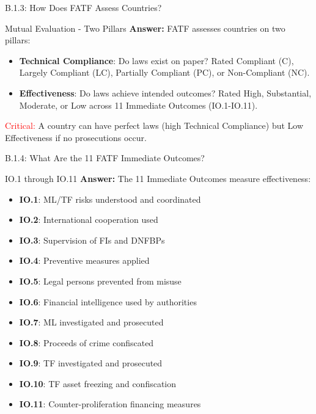 \documentclass{beamer}
\begin{document}
	\begin{frame}{B.1.3: How Does FATF Assess Countries?}
		\begin{block}{Mutual Evaluation - Two Pillars}
			\textbf{Answer:} FATF assesses countries on two pillars:
			\begin{itemize}
				\item \textbf{Technical Compliance}: Do laws exist on paper? Rated Compliant (C), Largely Compliant (LC), Partially Compliant (PC), or Non-Compliant (NC).
				\item \textbf{Effectiveness}: Do laws achieve intended outcomes? Rated High, Substantial, Moderate, or Low across 11 Immediate Outcomes (IO.1-IO.11).
			\end{itemize}
			\textcolor{red}{Critical:} A country can have perfect laws (high Technical Compliance) but Low Effectiveness if no prosecutions occur.
		\end{block}
	\end{frame}
	
	\begin{frame}{B.1.4: What Are the 11 FATF Immediate Outcomes?}
		\begin{block}{IO.1 through IO.11}
			\textbf{Answer:} The 11 Immediate Outcomes measure effectiveness:
			\begin{itemize}
				\item \textbf{IO.1}: ML/TF risks understood and coordinated
				\item \textbf{IO.2}: International cooperation used
				\item \textbf{IO.3}: Supervision of FIs and DNFBPs
				\item \textbf{IO.4}: Preventive measures applied
				\item \textbf{IO.5}: Legal persons prevented from misuse
				\item \textbf{IO.6}: Financial intelligence used by authorities
				\item \textbf{IO.7}: ML investigated and prosecuted
				\item \textbf{IO.8}: Proceeds of crime confiscated
				\item \textbf{IO.9}: TF investigated and prosecuted
				\item \textbf{IO.10}: TF asset freezing and confiscation
				\item \textbf{IO.11}: Counter-proliferation financing measures
			\end{itemize}
		\end{block}
	\end{frame}
	
\end{document}
